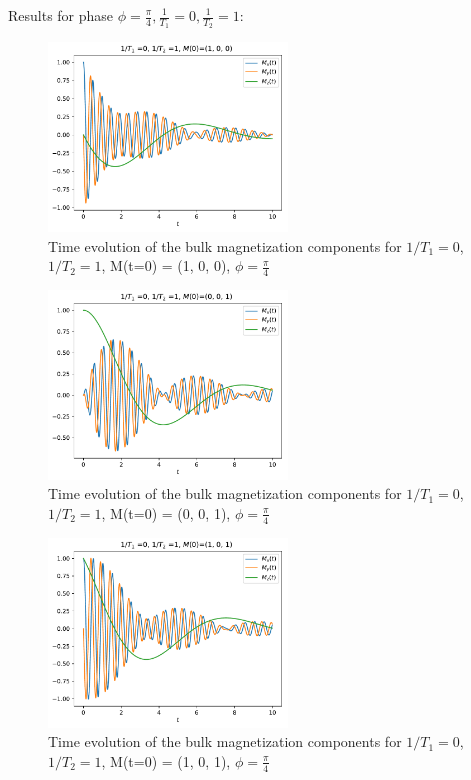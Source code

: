 \documentclass[journal]{IEEEtran} %
\begin{document}
Results for phase $\phi = \frac{\pi}{4}, \frac{1}{T_1} = 0, \frac{1}{T_2} = 1$:
\begin{figure}[H]
\centering
\includegraphics[width=2.5in]{figs/NMR_T1-0_T2-1_Minit-100_tau_0.01_t_10_phase_pi_4.pdf}
\caption{Time evolution of the bulk magnetization components for $1/T_1 = 0$, $1/T_2 = 1$, M(t=0) = (1, 0, 0), $\phi = \frac{\pi}{4}$}
\label{f16}
\end{figure}
\begin{figure}[H]
\centering
\includegraphics[width=2.5in]{figs/NMR_T1-0_T2-1_Minit-001_tau_0.01_t_10_phase_pi_4.pdf}
\caption{Time evolution of the bulk magnetization components for $1/T_1 = 0$, $1/T_2 = 1$, M(t=0) = (0, 0, 1), $\phi = \frac{\pi}{4}$}
\label{f17}
\end{figure}
\begin{figure}[H]
\centering
\includegraphics[width=2.5in]{figs/NMR_T1-0_T2-1_Minit-101_tau_0.01_t_10_phase_pi_4.pdf}
\caption{Time evolution of the bulk magnetization components for $1/T_1 = 0$, $1/T_2 = 1$, M(t=0) = (1, 0, 1), $\phi = \frac{\pi}{4}$}
\label{f18}
\end{figure}
\newpage
\end{document}
